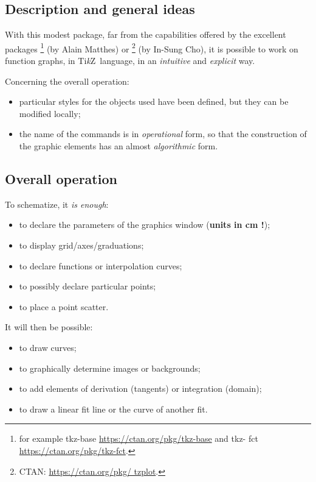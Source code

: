 \documentclass[11pt,a4paper]{ltxdoc}
\providecommand\tikzlogo{Ti\textit{k}Z}
\let\TikZ\tikzlogo
\begin{document}
\subsection{Description and general ideas}

With this modest package, far from the capabilities offered by the excellent packages \footnote{for example tkz-base \url{https://ctan.org/pkg/tkz-base} and tkz- fct \url{https://ctan.org/pkg/tkz-fct}.} (by Alain Matthes) or \footnote{CTAN: \url{https://ctan.org/pkg/ tzplot}.} (by In-Sung Cho), it is possible to work on function graphs, in \TikZ\ language, in an \textit{intuitive} and \textit{explicit} way.

\smallskip

Concerning the overall operation:

\smallskip

\begin{itemize}
	\item particular styles for the objects used have been defined, but they can be modified locally;
	\item the name of the commands is in \textit{operational} form, so that the construction of the graphic elements has an almost \textit{algorithmic} form.
\end{itemize}

\subsection{Overall operation}

To schematize, it \textit{is enough}:

\smallskip

\begin{itemize}
	\item to declare the parameters of the graphics window (\textbf{units in cm !});
	\item to display grid/axes/graduations;
	\item to declare functions or interpolation curves;
	\item to possibly declare particular points;
	\item to place a point scatter.
\end{itemize}

\smallskip

It will then be possible:

\begin{itemize}
	\item to draw curves;
	\item to graphically determine images or backgrounds;
	\item to add elements of derivation (tangents) or integration (domain);
	\item to draw a linear fit line or the curve of another fit.
\end{itemize}
\end{document}
